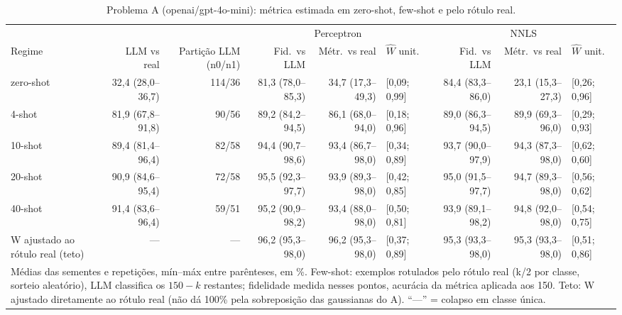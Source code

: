 \begin{table}[htbp]
\centering
\small
\caption{Problema A (openai/gpt-4o-mini): métrica estimada em zero-shot, few-shot e pelo rótulo real.}
\label{tab:T1_A_gpt4mini}
\begin{tabular}{lrrrrlrrl}
\toprule
 &  &  & \multicolumn{3}{c}{Perceptron} & \multicolumn{3}{c}{NNLS} \\ \cmidrule(lr){4-6} \cmidrule(lr){7-9}
Regime & LLM vs real & Partição LLM (n0/n1) & Fid.\ vs LLM & Métr.\ vs real & $\hat{W}$ unit. & Fid.\ vs LLM & Métr.\ vs real & $\hat{W}$ unit. \\
\midrule
zero-shot & 32,4 (28,0–36,7) & 114/36 & 81,3 (78,0–85,3) & 34,7 (17,3–49,3) & [0,09; 0,99] & 84,4 (83,3–86,0) & 23,1 (15,3–27,3) & [0,26; 0,96] \\
4-shot & 81,9 (67,8–91,8) & 90/56 & 89,2 (84,2–94,5) & 86,1 (68,0–94,0) & [0,18; 0,96] & 89,0 (86,3–94,5) & 89,9 (69,3–96,0) & [0,29; 0,93] \\
10-shot & 89,4 (81,4–96,4) & 82/58 & 94,4 (90,7–98,6) & 93,4 (86,7–98,0) & [0,34; 0,89] & 93,7 (90,0–97,9) & 94,3 (87,3–98,0) & [0,62; 0,60] \\
20-shot & 90,9 (84,6–95,4) & 72/58 & 95,5 (92,3–97,7) & 93,9 (89,3–98,0) & [0,42; 0,85] & 95,0 (91,5–97,7) & 94,7 (89,3–98,0) & [0,56; 0,62] \\
40-shot & 91,4 (83,6–96,4) & 59/51 & 95,2 (90,9–98,2) & 93,4 (88,0–98,0) & [0,50; 0,81] & 93,9 (89,1–98,2) & 94,8 (92,0–98,0) & [0,54; 0,75] \\
\midrule
W ajustado ao rótulo real (teto) & — & — & 96,2 (95,3–98,0) & 96,2 (95,3–98,0) & [0,37; 0,89] & 95,3 (93,3–98,0) & 95,3 (93,3–98,0) & [0,51; 0,86] \\
\bottomrule
\multicolumn{9}{p{0.95\linewidth}}{\footnotesize Médias das sementes e repetições, mín–máx entre parênteses, em \%. Few-shot: exemplos rotulados pelo rótulo real (k/2 por classe, sorteio aleatório), LLM classifica os $150-k$ restantes; fidelidade medida nesses pontos, acurácia da métrica aplicada aos 150. Teto: W ajustado diretamente ao rótulo real (não dá 100\% pela sobreposição das gaussianas do A). ``—'' = colapso em classe única.} \\
\end{tabular}
\end{table}
